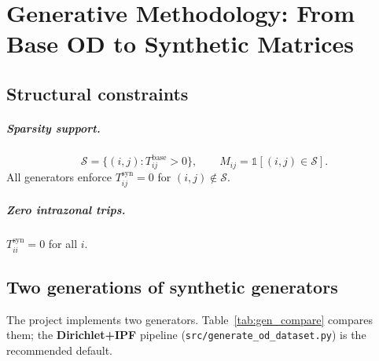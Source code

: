 \documentclass[11pt,a4paper]{report}
\begin{document}
\chapter{Generative Methodology: From Base OD to Synthetic Matrices}
\label{ch:generation}

\section{Structural constraints}

\paragraph{Sparsity support.}
\begin{equation}
    \mathcal{S} = \{(i,j) : T^{\mathrm{base}}_{ij} > 0\}, \qquad
    M_{ij} = \mathbb{1}[(i,j)\in\mathcal{S}].
\end{equation}
All generators enforce $T^{\mathrm{syn}}_{ij}=0$ for $(i,j)\notin\mathcal{S}$.

\paragraph{Zero intrazonal trips.}
$T_{ii}^{\mathrm{syn}} = 0$ for all $i$.

\section{Two generations of synthetic generators}

The project implements two generators. Table~\ref{tab:gen_compare} compares them; the \textbf{Dirichlet+IPF} pipeline (\texttt{src/generate\_od\_dataset.py}) is the recommended default.
\end{document}
